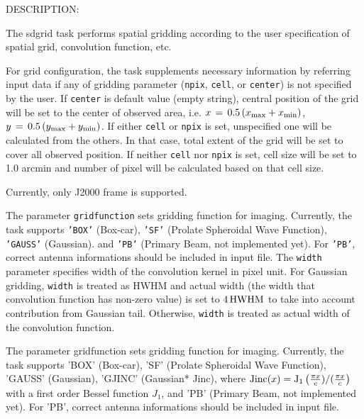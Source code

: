 DESCRIPTION:

The sdgrid task performs spatial gridding according to the user 
specification of spatial grid, convolution function, etc.

For grid configuration, the task supplements necessary information 
by referring input data if any of gridding parameter ({\tt npix}, 
{\tt cell}, or {\tt center}) is not specified by the user. 
If {\tt center} is 
default value (empty string), central position of the grid will be 
set to the center of observed area, i.e. 
$ x \, = \, 0.5 \, (x_{\rm max} + x_{\rm min}) $, 
$ y \, = \, 0.5 \, (y_{\rm max} + y_{\rm min}) $. 
If either {\tt cell} or {\tt npix} is set, unspecified 
one will be calculated from the others. In that case, total extent of 
the grid will be set to cover all observed position. If neither {\tt cell}
nor {\tt npix} is set, cell size will be set to 1.0 arcmin and number of 
pixel will be calculated based on that cell size.
 
Currently, only J2000 frame is supported.
 
The parameter {\tt gridfunction} sets gridding function for imaging. 
Currently, the task supports {\tt 'BOX'} (Box-car), {\tt 'SF'} (Prolate 
Spheroidal Wave Function), {\tt 'GAUSS'} (Gaussian). and {\tt 'PB'} 
(Primary Beam, not implemented yet). For {\tt 'PB'}, correct 
antenna informations should be included in input file. 
The {\tt width} parameter specifies width of the convolution kernel 
in pixel unit. For Gaussian gridding, {\tt width} is treated as HWHM 
and actual width (the width that convolution function has non-zero 
value) is set to $ 4 \, {\rm HWHM} $ to take into account contribution from 
Gaussian tail. Otherwise, {\tt width} is treated as actual width of the 
convolution function. 

The parameter gridfunction sets gridding function for imaging. 
Currently, the task supports 'BOX' (Box-car), 'SF' (Prolate 
Spheroidal Wave Function), 'GAUSS' (Gaussian), 'GJINC' (Gaussian*
Jinc), where 
${\rm Jinc}(x) = {\rm J}_1 \left( \frac{\pi x}{c})/(\frac{\pi x}{c} \right)$ 
with a first order 
Bessel function $J_1$, and 'PB' (Primary Beam, not implemented yet). 
For 'PB', correct antenna informations should be included in input 
file. 

